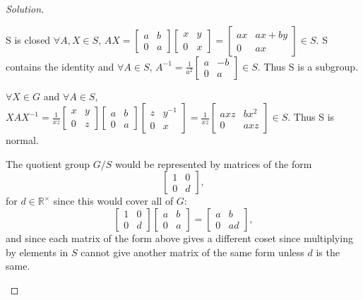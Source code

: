 \documentclass{article}
\newenvironment{solution}
{\renewcommand\qedsymbol{$\blacksquare$}\begin{proof}[Solution]}
{\end{proof}}
\begin{document}
\begin{solution}
\begin{enumerate}{}
        S is closed $\forall A, X \in S$, $AX = \begin{bmatrix}
            a & b \\ 0 & a
        \end{bmatrix}\begin{bmatrix}
            x & y \\ 0 & x
        \end{bmatrix} = \begin{bmatrix}
            ax & ax + by \\ 0 & ax
        \end{bmatrix} \in S$. S contains the identity and $\forall A \in S$, $A^{-1} = \frac{1}{a^2}\begin{bmatrix}
            a & -b \\ 0 & a
        \end{bmatrix} \in S$. Thus S is a subgroup.


        $\forall X \in G$ and $\forall A \in S$, $XAX^{-1} = \frac{1}{xz}\begin{bmatrix}
            x & y \\ 0 & z
        \end{bmatrix}\begin{bmatrix}
            a & b \\ 0 & a
        \end{bmatrix}\begin{bmatrix}
            z & y^{-1} \\ 0 & x
        \end{bmatrix} = \frac{1}{xz}\begin{bmatrix}
            axz & bx^2 \\ 0 & axz
        \end{bmatrix} \in S$. Thus S is normal.

        The quotient group $G/S$ would be represented by matrices of the form
  \begin{equation*}
    \begin{bmatrix}
      1 & 0\\
      0 & d
    \end{bmatrix},
  \end{equation*}
  for $d \in \mathbb{R}^\times$ since this would cover all of $G$:
  \begin{equation*}
    \begin{bmatrix}
      1 & 0\\
      0 & d
    \end{bmatrix}
    \begin{bmatrix}
      a & b\\
      0 & a
    \end{bmatrix}
    =
    \begin{bmatrix}
      a & b\\
      0 & ad
    \end{bmatrix},
  \end{equation*}
  and since each matrix of the form above gives a different coset since multiplying by elements in $S$ cannot give another matrix of the same form unless $d$ is the same.
    \end{enumerate}
\end{solution}
\end{document}
